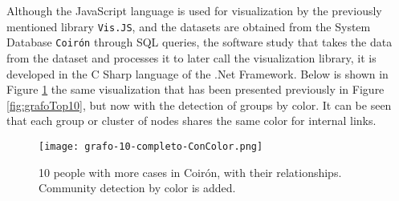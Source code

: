 Although the JavaScript language is used for visualization by the previously mentioned library \texttt{Vis.JS}, and the datasets are obtained from the System Database \texttt{Coirón} through SQL queries, the software study that takes the data from the dataset and processes it to later call the visualization library, it is developed in the C Sharp language of the .Net Framework.
Below is shown in Figure \ref{fig:grafo-10-completo-ConColor} the same visualization that has been presented previously in Figure \ref{fig:grafoTop10}, but now with the detection of groups by color. It can be seen that each group or cluster of nodes shares the same color for internal links.



\begin{figure}
	\centering
	\texttt{[image: grafo-10-completo-ConColor.png]}
	\caption{10 people with more cases in Coirón, with their relationships. Community detection by color is added.} 
	\label{fig:grafo-10-completo-ConColor}
\end{figure}
